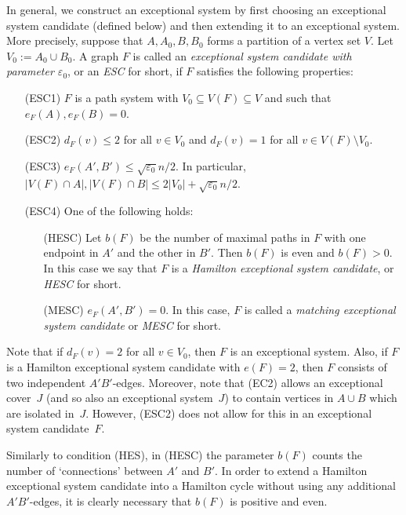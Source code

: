 \documentclass{memo-l}
\def\COMMENT#1{}
\def\eps{\varepsilon}
\def\epszero{\eps_0}
\numberwithin{section}{chapter}
\numberwithin{equation}{section}
\numberwithin{firstthm}{section}
\numberwithin{figure}{section}
\begin{document}
In general, we construct an exceptional system by first choosing an exceptional system candidate (defined below) and then extending it to an
exceptional system. More precisely, suppose that $A,A_0,B,B_0$ forms a partition of a vertex set $V$.
Let $V_0:=A_0\cup B_0$. A graph $F$ is called an \emph{exceptional system candidate with parameter
$\eps_0$}, or an \emph{ESC} for short, if $F$ satisfies the following properties:
\begin{itemize}
	\item[(ESC1)] $F$ is a path system with $V_0\subseteq V(F)\subseteq V$ and such that $e_F(A), e_F(B) = 0$.
	\item[(ESC2)] $d_F(v) \le 2$ for all $v \in V_0$ and $d_F(v) = 1$ for all $v \in V(F) \setminus V_0$.
	\item[(ESC3)] $e_F(A',B') \le \sqrt{ \epszero}  n/2$. In particular, $|V(F) \cap A|, |V(F) \cap B| \le 2|V_0| + \sqrt{ \epszero } n/2$.
	\item[(ESC4)] One of the following holds:
\begin{itemize}
\item[(HESC)] Let $b(F)$ be the number of maximal paths in $F$ with one endpoint in $A'$ and the other in $B'$. Then $b(F)$ is even
and $b(F)>0$. In this case we say that $F$ is a \emph{Hamilton exceptional system candidate}, or \emph{HESC} for short.
\item[(MESC)] $e_F(A',B') =0$. In this case, $F$ is called a \emph{matching exceptional system candidate} or \emph{MESC} for short.
\end{itemize}
\end{itemize}
Note that if $d_F(v) = 2$ for all $v \in V_0$, then $F$ is an exceptional system. 
Also, if $F$ is a Hamilton exceptional system candidate with $e(F) =2$, then $F$ consists of two independent $A'B'$-edges.
Moreover, note that (EC2) allows an exceptional cover~$J$
(and so also an exceptional system~$J$) to contain vertices in $A\cup B$ which are isolated in~$J$. However, (ESC2) does not allow for this
in an exceptional system candidate~$F$.%
    \COMMENT{The latter is quite handy since it allows us to write
$|V(F) \cap A|$ for the number of vertices in $A$ which a incident to an edge of $F$. The former ensures that things are the same as in the
bipartite case for (balanced) exceptional systems and so in the approx paper we don't use two different versions...}

Similarly to condition (HES), in (HESC) the parameter $b(F)$ counts the number of `connections' between $A'$ and $B'$.
In order to extend a Hamilton exceptional system candidate into a Hamilton cycle without using any additional $A'B'$-edges, it is clearly necessary that $b(F)$
is positive and even.
\end{document}
